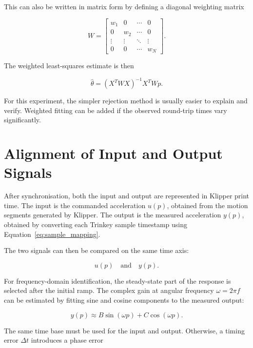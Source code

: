 \documentclass[11pt,a4paper]{article}
\begin{document}
This can also be written in matrix form by defining a diagonal weighting matrix

\begin{equation}
    W =
    \begin{bmatrix}
        w_1 & 0 & \cdots & 0 \\
        0 & w_2 & \cdots & 0 \\
        \vdots & \vdots & \ddots & \vdots \\
        0 & 0 & \cdots & w_N
    \end{bmatrix}.
\end{equation}

The weighted least-squares estimate is then

\begin{equation}
    \hat{\theta} = (X^T W X)^{-1}X^T W p.
\end{equation}

For this experiment, the simpler rejection method is usually easier to explain
and verify. Weighted fitting can be added if the observed round-trip times vary
significantly.

\section{Alignment of Input and Output Signals}

After synchronisation, both the input and output are represented in Klipper
print time. The input is the commanded acceleration \(u(p)\), obtained from the
motion segments generated by Klipper. The output is the measured acceleration
\(y(p)\), obtained by converting each Trinkey sample timestamp using
Equation~\eqref{eq:sample_mapping}.

The two signals can then be compared on the same time axis:

\begin{equation}
    u(p) \quad \text{and} \quad y(p).
\end{equation}

For frequency-domain identification, the steady-state part of the response is
selected after the initial ramp. The complex gain at angular frequency
\(\omega = 2\pi f\) can be estimated by fitting sine and cosine components to
the measured output:

\begin{equation}
    y(p) \approx B\sin(\omega p) + C\cos(\omega p).
\end{equation}

The same time base must be used for the input and output. Otherwise, a timing
error \(\Delta t\) introduces a phase error
\end{document}
